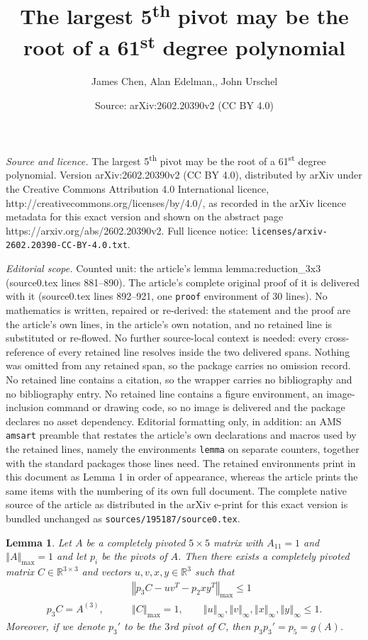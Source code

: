 \documentclass[10pt,a4paper]{amsart}
\title{The largest 5\textsuperscript{th} pivot may be the root of a 61\textsuperscript{st} degree polynomial}
\author{James Chen, Alan Edelman,, John Urschel}
\date{Source: arXiv:2602.20390v2 (CC BY 4.0)}
\newtheorem{lemma}{Lemma}
\newcommand\R{\mathbb{R}}
\newcommand{\norm}[1]{\left\Vert #1 \right\Vert}
\begin{document}
\maketitle

\noindent\emph{Source and licence.} The largest 5\textsuperscript{th} pivot may be the root of a 61\textsuperscript{st} degree polynomial. Version arXiv:2602.20390v2 (CC BY 4.0), distributed by arXiv under the Creative Commons Attribution 4.0 International licence, http://creativecommons.org/licenses/by/4.0/, as recorded in the arXiv licence metadata for this exact version and shown on the abstract page https://arxiv.org/abs/2602.20390v2. Full licence notice: \texttt{licenses/arxiv-2602.20390-CC-BY-4.0.txt}.\par\smallskip

\noindent\textit{Editorial scope.} Counted unit: the article's lemma lemma:reduction\_3x3 (source0.tex lines 881--890). The article's complete original proof of it is delivered with it (source0.tex lines 892--921, one \texttt{proof} environment of 30 lines). No mathematics is written, repaired or re-derived: the statement and the proof are the article's own lines, in the article's own notation, and no retained line is substituted or re-flowed.  No further source-local context is needed: every cross-reference of every retained line resolves inside the two delivered spans.  Nothing was omitted from any retained span, so the package carries no omission record.  No retained line contains a citation, so the wrapper carries no bibliography and no bibliography entry.  No retained line contains a figure environment, an image-inclusion command or drawing code, so no image is delivered and the package declares no asset dependency.  Editorial formatting only, in addition: an AMS \texttt{amsart} preamble that restates the article's own declarations and macros used by the retained lines, namely the environments \texttt{lemma} on separate counters, together with the standard packages those lines need.  The retained environments print in this document as Lemma 1 in order of appearance, whereas the article prints the same items with the numbering of its own full document.  The complete native source of the article as distributed in the arXiv e-print for this exact version is bundled unchanged as \texttt{sources/195187/source0.tex}.
\begin{lemma}
\label{lemma:reduction_3x3}
    Let $A$ be a completely pivoted $5 \times 5$ matrix with $A_{11} = 1$ and $\norm{A}_{\max} = 1$ and let $p_i$ be the pivots of $A$. Then there exists a completely pivoted matrix $C \in \R^{3 \times 3}$ and vectors $u,v,x,y \in \R^3$ such that 
\begin{align}
\label{eq:low_rank_5x5_pivot} 
    &\norm{p_3 C - uv^T - p_2 xy^T}_{\max} \leq 1\\
    p_3 C = A^{(3)}, \qquad &\norm{C}_{\max} = 1,\qquad \norm{u}_\infty, \norm{v}_\infty, \norm{x}_\infty, \norm{y}_\infty \leq 1 \nonumber.
\end{align}
Moreover, if we denote $p_3'$ to be the $3$rd pivot of $C$, then $p_3 p_3' = p_5 = g(A)$.
\end{lemma}
\end{document}
